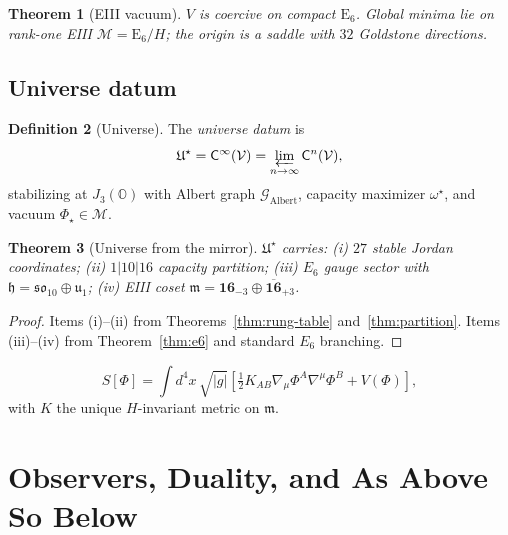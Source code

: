\documentclass[aps,prd,onecolumn,amsmath,amssymb,nofootinbib,11pt]{revtex4-2}
\numberwithin{equation}{section}
\theoremstyle{plain}
\newtheorem{theorem}{Theorem}[section]
\theoremstyle{definition}
\newtheorem{definition}[theorem]{Definition}
\theoremstyle{remark}
\newcommand{\jalg}{J_3(\mathbb{O})}
\newcommand{\E}[1]{\mathrm{E}_{#1}}
\newcommand{\Void}{\mathcal{V}}
\newcommand{\Climb}{\mathsf{C}}
\newcommand{\orderparam}{\Phi}
\begin{document}
\begin{theorem}[EIII vacuum]\label{thm:vacuum}
$V$ is coercive on compact $\E{6}$. Global minima lie on rank-one EIII
$\mathcal{M}=\E{6}/H$; the origin is a saddle with $32$ Goldstone directions.
\end{theorem}

\subsection{Universe datum}
\label{sec:universe:datum}

\begin{definition}[Universe]\label{def:universe}
The \emph{universe datum} is
\begin{equation}\label{eq:universe}
  \mathfrak{U}^\star=\Climb^\infty(\Void)
  =\varprojlim_{n\to\infty}\Climb^n(\Void),
\end{equation}
stabilizing at $\jalg$ with Albert graph $\mathcal{G}_{\mathrm{Albert}}$,
capacity maximizer $\omega^\star$, and vacuum $\orderparam_\star\in\mathcal{M}$.
\end{definition}

\begin{theorem}[Universe from the mirror]\label{thm:universe}
$\mathfrak{U}^\star$ carries: (i) $27$ stable Jordan coordinates;
(ii) $1|10|16$ capacity partition; (iii) $E_6$ gauge sector with
$\mathfrak{h}=\mathfrak{so}_{10}\oplus\mathfrak{u}_1$; (iv) EIII coset
$\mathfrak{m}=\mathbf{16}_{-3}\oplus\overline{\mathbf{16}}_{+3}$.
\end{theorem}

\begin{proof}
Items (i)--(ii) from Theorems~\ref{thm:rung-table} and~\ref{thm:partition}.
Items (iii)--(iv) from Theorem~\ref{thm:e6} and standard $E_6$ branching.
\end{proof}

\begin{equation}\label{eq:action}
  S[\orderparam]=\int d^4x\,\sqrt{|g|}\left[\tfrac12 K_{AB}\nabla_\mu\orderparam^A\nabla^\mu\orderparam^B+V(\orderparam)\right],
\end{equation}
with $K$ the unique $H$-invariant metric on $\mathfrak{m}$.%
\section{Observers, Duality, and As Above So Below}
\label{sec:observer}
\end{document}
